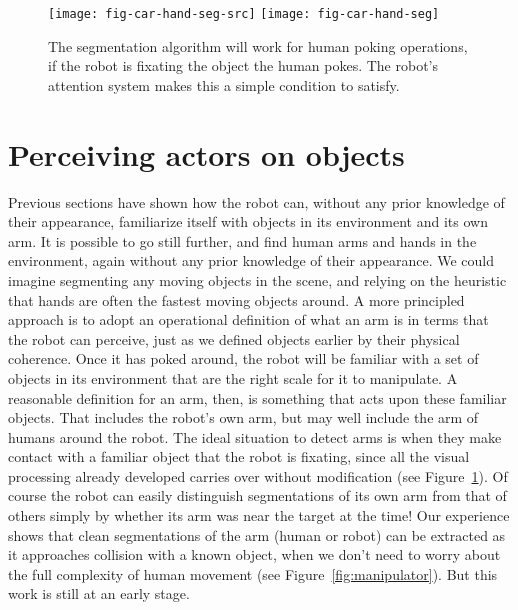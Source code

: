 
\begin{figure}[tbh]
  \centerline{
\texttt{[image: fig-car-hand-seg-src]}
\hspace{1cm}
\texttt{[image: fig-car-hand-seg]}
}
  \caption{
The segmentation algorithm will work for human poking operations, 
if the robot is fixating the object the human pokes.  The robot's 
attention system makes this a simple condition to satisfy.
}
  \label{fig:hand-poke}
\end{figure}


\section{Perceiving actors on objects}

\label{sect:manipulator}

Previous sections have shown how the robot can, without any prior
knowledge of their appearance, familiarize itself with objects in its
environment and its own arm.  It is possible to go still further, and
find human arms and hands in the environment, again without any prior
knowledge of their appearance.  We could imagine segmenting any moving
objects in the scene, and relying on the heuristic that hands are
often the fastest moving objects around.  A more principled approach
is to adopt an operational definition of what an arm is in terms that
the robot can perceive, just as we defined objects earlier by their
physical coherence.  Once it has poked around, the robot will be
familiar with a set of objects in its environment that are the right
scale for it to manipulate.  A reasonable definition for an arm, then,
is something that acts upon these familiar objects.  That includes the
robot's own arm, but may well include the arm of humans around the
robot. The ideal situation to detect arms is when they make contact
with a familiar object that the robot is fixating, since all the
visual processing already developed carries over without modification
(see Figure~\ref{fig:hand-poke}).  Of course the robot can easily
distinguish segmentations of its own arm from that of others simply by
whether its arm was near the target at the time!  Our experience shows
that clean segmentations of the arm (human or robot) can be extracted
as it approaches collision with a known object, when we don't need to
worry about the full complexity of human movement (see
Figure~\ref{fig:manipulator}).  But this work is still at an early stage.

